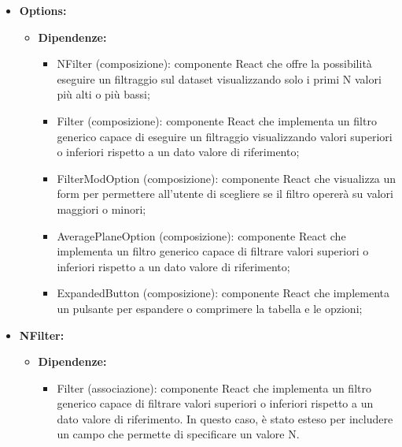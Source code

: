 \begin{itemize}
      \item \textbf{Options:}
            \begin{itemize}
                  \item \textbf{Dipendenze:}
                        \begin{itemize}
                              \item NFilter (composizione): componente React che offre la possibilità eseguire un
                                    filtraggio sul dataset visualizzando solo i primi N valori più alti o più
                                    bassi;
                              \item Filter (composizione): componente React che implementa un filtro generico
                                    capace di eseguire un filtraggio visualizzando valori superiori o inferiori
                                    rispetto a un dato valore di riferimento;
                              \item FilterModOption (composizione): componente React che visualizza un form per
                                    permettere all'utente di scegliere se il filtro opererà su valori maggiori o
                                    minori;
                              \item AveragePlaneOption (composizione): componente React che implementa un filtro
                                    generico capace di filtrare valori superiori o inferiori rispetto a un dato
                                    valore di riferimento;
                              \item ExpandedButton (composizione): componente React che implementa un pulsante per
                                    espandere o comprimere la tabella e le opzioni;
                        \end{itemize}
            \end{itemize}
      \item \textbf{NFilter:}
            \begin{itemize}
                  \item \textbf{Dipendenze:}
                        \begin{itemize}
                              \item Filter (associazione): componente React che implementa un filtro generico
                                    capace di filtrare valori superiori o inferiori rispetto a un dato valore di
                                    riferimento. In questo caso, è stato esteso per includere un campo che permette
                                    di specificare un valore N.
                        \end{itemize}
            \end{itemize}
\end{itemize}

